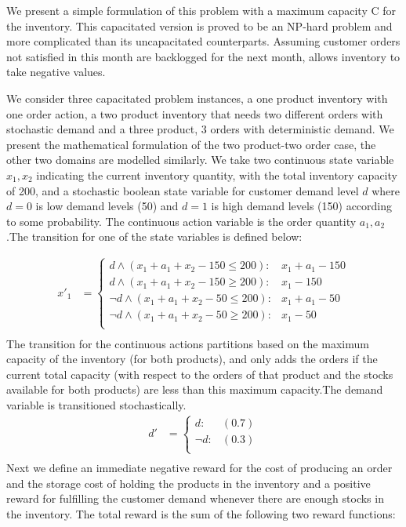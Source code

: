 We present a simple formulation of this problem with a maximum capacity C for the inventory. This capacitated version is proved to be an NP-hard problem \cite{bitran} and more complicated than its uncapacitated counterparts. Assuming customer orders not satisfied in this month are backlogged for the next month, allows inventory to take negative values. 

We consider three capacitated problem instances, a one product inventory with one order action, a two product inventory that needs two different orders with stochastic demand and a three product, 3 orders with deterministic demand.
We present the mathematical formulation of the two product-two order case, the other two domains are modelled similarly. We take two continuous state variable $x_1,x_2$ indicating the current inventory quantity, with the total inventory capacity of 200, and a stochastic boolean state variable for customer demand level $d$ where $d=0$ is low demand levels (50) and $d=1$ is high demand levels (150) according to some probability. The continuous action variable is the order quantity $a_1,a_2$.The transition for one of the state variables is defined below:
 
{\footnotesize
\begin{align*}
x'_1 & = \begin{cases}
d \wedge (x_1 + a_1 + x_2 - 150 \leq 200) : & x_1 + a_1 - 150 \\
d \wedge (x_1 + a_1 + x_2 - 150 \geq 200) : & x_1 - 150 \\
\neg d \wedge (x_1 + a_1 + x_2 - 50 \leq 200): & x_1 + a_1 - 50 \\
\neg d \wedge (x_1 + a_1 + x_2 - 50 \geq 200): & x_1 - 50 \\
\end{cases}\\
\end{align*}}
The transition for the continuous actions partitions based on the maximum
capacity of the inventory (for both products), and only adds the orders if
the current total capacity (with respect to the orders of that product and
the stocks available for both products) are less than this maximum capacity.The demand variable is transitioned stochastically. 
{\footnotesize
\begin{align*}
d' & = \begin{cases}
d : &(0.7)\\
\neg d: &(0.3)\\
\end{cases}\\
\end{align*}}
Next we define an immediate negative reward for the cost of producing an order
and the storage cost of holding the products in the inventory and a
positive reward for fulfilling the customer demand whenever there are enough
stocks in the inventory. The total reward is the sum of the following two reward functions:
      			
